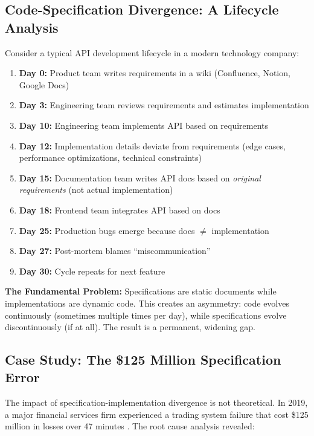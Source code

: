 \subsection{Code-Specification Divergence: A Lifecycle Analysis}

Consider a typical API development lifecycle in a modern technology company:

\begin{enumerate}
    \item \textbf{Day 0:} Product team writes requirements in a wiki (Confluence, Notion, Google Docs)
    \item \textbf{Day 3:} Engineering team reviews requirements and estimates implementation
    \item \textbf{Day 10:} Engineering team implements API based on requirements
    \item \textbf{Day 12:} Implementation details deviate from requirements (edge cases, performance optimizations, technical constraints)
    \item \textbf{Day 15:} Documentation team writes API docs based on \textit{original requirements} (not actual implementation)
    \item \textbf{Day 18:} Frontend team integrates API based on docs
    \item \textbf{Day 25:} Production bugs emerge because docs $\neq$ implementation
    \item \textbf{Day 27:} Post-mortem blames ``miscommunication''
    \item \textbf{Day 30:} Cycle repeats for next feature
\end{enumerate}

\textbf{The Fundamental Problem:} Specifications are static documents while implementations are dynamic code. This creates an asymmetry: code evolves continuously (sometimes multiple times per day), while specifications evolve discontinuously (if at all). The result is a permanent, widening gap.

\subsection{Case Study: The \$125 Million Specification Error}

The impact of specification-implementation divergence is not theoretical. In 2019, a major financial services firm experienced a trading system failure that cost \$125 million in losses over 47 minutes \cite{finra2020trading}. The root cause analysis revealed:

